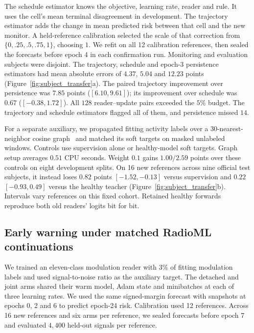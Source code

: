 The schedule estimator knows the objective, learning rate, reader and
rule. It uses the cell's mean terminal disagreement in development.
The trajectory estimator adds the change in mean predicted risk between
that cell and the new monitor. A held-reference calibration selected
the scale of that correction from $\{0,.25,.5,.75,1\}$, choosing $1$.
We refit on all 12 calibration references, then sealed the forecasts
before epoch 4 in each confirmation run. Monitoring and evaluation
subjects were disjoint. The trajectory, schedule and epoch-3 persistence
estimators had mean absolute errors of $4.37$, $5.04$ and $12.23$ points
(Figure~\ref{fig:subject_transfer}a). The paired trajectory improvement
over persistence was $7.85$ points ($[6.10,9.61]$); its improvement over
schedule was $0.67$ ($[-0.38,1.72]$). All $128$ reader--update pairs
exceeded the $5\%$ budget. The trajectory and schedule estimators flagged
all of them, and persistence missed $14$.

For a separate auxiliary, we propagated fitting activity labels over a
30-nearest-neighbor cosine graph~\citep{zhu2003harmonic} and matched its
soft targets on masked unlabeled windows. Controls use supervision alone
or healthy-model soft targets. Graph setup averages $0.51$ CPU seconds.
Weight $0.1$ gains $1.00/2.59$ points over these controls on eight development
splits. On 16 new references across nine official test subjects, it instead
loses $0.82$ points $[-1.52,-0.13]$ versus supervision and $0.22$
$[-0.93,0.49]$ versus the healthy teacher (Figure~\ref{fig:subject_transfer}b).
Intervals vary references on this fixed cohort. Retained healthy forwards
reproduce both old readers' logits bit for bit.

\subsection{Early warning under matched RadioML continuations}
\label{app:rml_trajectory}

We trained an eleven-class modulation reader with $3\%$ of fitting
modulation labels and used signal-to-noise ratio as the auxiliary target.
The detached and joint arms shared their warm model, Adam state and
minibatches at each of three learning rates. We used the same
signed-margin forecast with snapshots at epochs 0, 2 and 6 to predict
epoch-24 risk. Calibration used 12 references. Across 16 new references
and six arms per reference, we sealed forecasts before epoch 7 and
evaluated $4{,}400$ held-out signals per reference.

